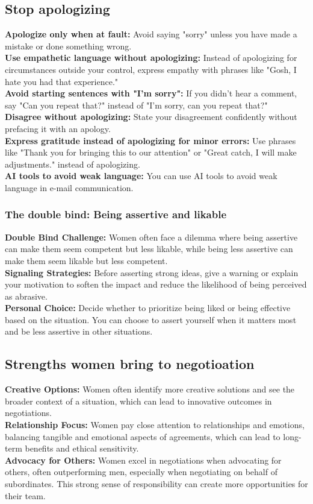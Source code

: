 \documentclass[12pt]{article}
\begin{document}
\subsection{Stop apologizing}
\textbf{Apologize only when at fault:}  Avoid saying "sorry" unless you have made a mistake or done something wrong.\\
\textbf{Use empathetic language without apologizing:} Instead of apologizing for circumstances outside your control, express empathy with phrases like "Gosh, I hate you had that experience."\\
\textbf{Avoid starting sentences with "I'm sorry":}  If you didn't hear a comment, say "Can you repeat that?" instead of "I'm sorry, can you repeat that?"\\
\textbf{Disagree without apologizing:}  State your disagreement confidently without prefacing it with an apology.\\
\textbf{Express gratitude instead of apologizing for minor errors:} Use phrases like "Thank you for bringing this to our attention" or "Great catch, I will make adjustments." instead of apologizing.\\
\textbf{AI tools to avoid weak language:} You can use AI tools to avoid weak language in e-mail communication.

\subsubsection{The double bind: Being assertive and likable}
\textbf{Double Bind Challenge:}  Women often face a dilemma where being assertive can make them seem competent but less likable, while being less assertive can make them seem likable but less competent.\\
\textbf{Signaling Strategies:}  Before asserting strong ideas, give a warning or explain your motivation to soften the impact and reduce the likelihood of being perceived as abrasive.\\
\textbf{Personal Choice:}  Decide whether to prioritize being liked or being effective based on the situation. You can choose to assert yourself when it matters most and be less assertive in other situations.

\subsection{Strengths women bring to negotioation}
\textbf{Creative Options:}  Women often identify more creative solutions and see the broader context of a situation, which can lead to innovative outcomes in negotiations.\\
\textbf{Relationship Focus:}  Women pay close attention to relationships and emotions, balancing tangible and emotional aspects of agreements, which can lead to long-term benefits and ethical sensitivity.\\
\textbf{Advocacy for Others:}  Women excel in negotiations when advocating for others, often outperforming men, especially when negotiating on behalf of subordinates. This strong sense of responsibility can create more opportunities for their team.\\
\end{document}
